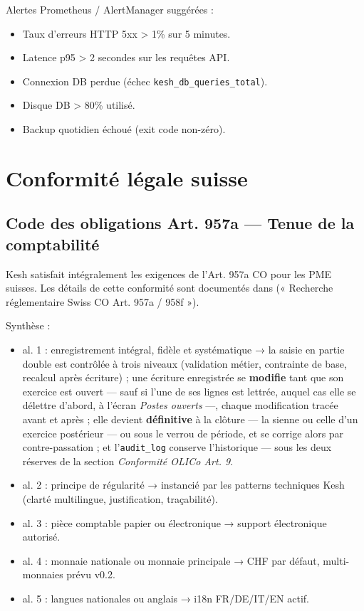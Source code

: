 \documentclass[a4paper,11pt,oneside]{article}
\begin{document}
Alertes Prometheus / AlertManager suggérées :

\begin{itemize}
    \item Taux d'erreurs HTTP 5xx > 1\% sur 5 minutes.
    \item Latence p95 > 2 secondes sur les requêtes API.
    \item Connexion DB perdue (échec \texttt{kesh\_db\_queries\_total}).
    \item Disque DB > 80\% utilisé.
    \item Backup quotidien échoué (exit code non-zéro).
\end{itemize}

\section{Conformité légale suisse}

\subsection{Code des obligations Art. 957a — Tenue de la comptabilité}

Kesh satisfait intégralement les exigences de l'Art. 957a CO pour les PME suisses. Les détails de cette conformité sont documentés dans  (« Recherche réglementaire Swiss CO Art. 957a / 958f »).

Synthèse :

\begin{itemize}
    \item al. 1 : enregistrement intégral, fidèle et systématique → la saisie en partie double est contrôlée à trois niveaux (validation métier, contrainte de base, recalcul après écriture) ; une écriture enregistrée se \textbf{modifie} tant que son exercice est ouvert --- sauf si l'une de ses lignes est lettrée, auquel cas elle se délettre d'abord, à l'écran \emph{Postes ouverts} ---, chaque modification tracée avant et après ; elle devient \textbf{définitive} à la clôture --- la sienne ou celle d'un exercice postérieur --- ou sous le verrou de période, et se corrige alors par contre-passation ; et l'\texttt{audit\_log} conserve l'historique — sous les deux réserves de la section \emph{Conformité OLICo Art. 9}.
    \item al. 2 : principe de régularité → instancié par les patterns techniques Kesh (clarté multilingue, justification, traçabilité).
    \item al. 3 : pièce comptable papier ou électronique → support électronique autorisé.
    \item al. 4 : monnaie nationale ou monnaie principale → CHF par défaut, multi-monnaies prévu v0.2.
    \item al. 5 : langues nationales ou anglais → i18n FR/DE/IT/EN actif.
\end{itemize}
\end{document}

